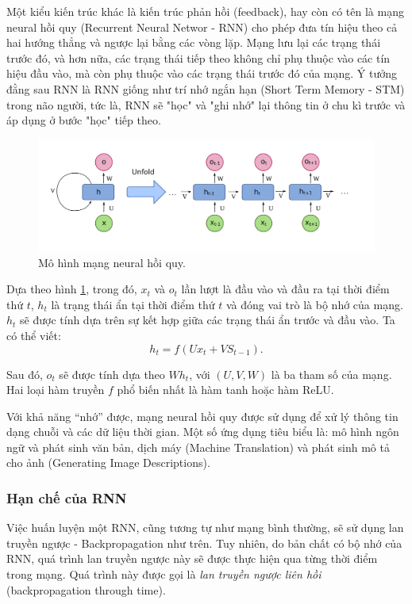     Một kiểu kiến trúc khác là kiến trúc phản hồi (feedback), hay còn có tên là mạng neural hồi quy (Recurrent Neural Networ - RNN) cho phép đưa tín hiệu theo cả hai hướng thẳng và ngược lại bằng các vòng lặp. Mạng lưu lại các trạng thái trước đó, và hơn nữa, các trạng thái tiếp theo không chỉ phụ thuộc vào các tín hiệu đầu vào, mà còn phụ thuộc vào các trạng thái trước đó của mạng. Ý tưởng đằng sau RNN là RNN giống như trí nhớ ngắn hạn (Short Term Memory - STM) trong não người, tức là, RNN sẽ "học" và "ghi nhớ" lại thông tin ở chu kì trước và áp dụng ở bước "học" tiếp theo.
    \clearpage
    \begin{figure}[htp]
        \centering
        \includegraphics[width=15 cm]{images/rnn_unfold.png}
        \caption{Mô hình mạng neural hồi quy. \cite{rnn_unfold}}
        \label{fig:rnn_unfold}
    \end{figure}
    
    Dựa theo hình \ref{fig:rnn_unfold}, trong đó, $x_t$ và $o_t$ lần lượt là đầu vào và đầu ra tại thời điểm thứ $t$, $h_t$ là trạng thái ẩn tại thời điểm thứ $t$ và đóng vai trò là bộ nhớ của mạng. $h_t$ sẽ được tính dựa trên sự kết hợp giữa các trạng thái ẩn trước và đầu vào. Ta có thể viết:
    $$h_t = f(Ux_t + VS_{t-1}).$$
    
    Sau đó, $o_t$ sẽ được tính dựa theo $Wh_t$, với $(U, V, W)$ là ba tham số của mạng. Hai loại hàm truyền $f$ phổ biến nhất là hàm tanh hoặc hàm ReLU.
    
    Với khả năng “nhớ” được, mạng neural hồi quy được sử dụng để xử lý thông tin dạng chuỗi và các dữ liệu thời gian. Một số ứng dụng tiêu biểu là: mô hình ngôn ngữ và phát sinh văn bản, dịch máy (Machine Translation) và phát sinh mô tả cho ảnh (Generating Image Descriptions).
    
    \subsubsection{Hạn chế của RNN}
    Việc huấn luyện một RNN, cũng tương tự như mạng bình thường, sẽ sử dụng lan truyền ngược - Backpropagation như trên. Tuy nhiên, do bản chất có bộ nhớ của RNN, quá trình lan truyền ngược này sẽ được thực hiện qua từng thời điểm trong mạng. Quá trình này được gọi là \textit{lan truyền ngược liên hồi} (backpropagation through time).
    

